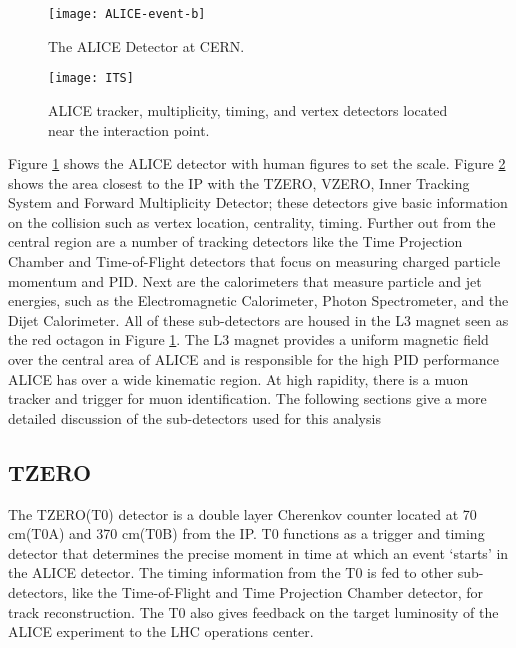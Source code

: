 \begin{figure}[h!]
\texttt{[image: ALICE-event-b]}
\centering
\caption{The ALICE Detector at CERN\cite{Alberico:2011zy}.}
 \label{fig:alice}
\end{figure}

\begin{figure}[h!]
\texttt{[image: ITS]}
\centering
\caption{ALICE tracker, multiplicity, timing, and vertex detectors located near the interaction point\cite{Alberico:2011zy}.}
 \label{fig:ITS}
\end{figure}

\noindent
Figure \ref{fig:alice} shows the ALICE detector with human figures to set the scale.  Figure \ref{fig:ITS} shows the area closest to the IP with the TZERO, VZERO, Inner Tracking System and Forward Multiplicity Detector; these detectors give basic information on the collision such as vertex location, centrality, timing.   Further out from the central region are a number of tracking detectors like the Time Projection Chamber and Time-of-Flight detectors that focus on  measuring charged particle momentum and PID.  Next are the calorimeters that measure particle and jet energies, such as the Electromagnetic Calorimeter, Photon Spectrometer, and the Dijet Calorimeter.  All of these sub-detectors are housed in the L3 magnet seen as the red octagon in Figure \ref{fig:alice}.   The L3 magnet provides a uniform magnetic field over the central area of ALICE and is responsible for the high PID performance ALICE has over a wide kinematic region\cite{Gligorov:2018vkc}.  At high rapidity, there is a muon tracker and trigger for muon identification.  The following sections give a more detailed discussion of the sub-detectors used for this analysis

\subsection{TZERO}
The TZERO(T0)\cite{Bondila:2005xy} detector is a double layer Cherenkov counter located at 70 cm(T0A) and 370 cm(T0B) from the IP.  T0 functions as a trigger and timing detector that determines the precise moment in time at which an event `starts' in the ALICE detector.  The timing information from the T0 is fed to other sub-detectors, like the Time-of-Flight and Time Projection Chamber detector, for track reconstruction.  The T0 also gives feedback on the target luminosity of the ALICE experiment to the LHC operations center.  

